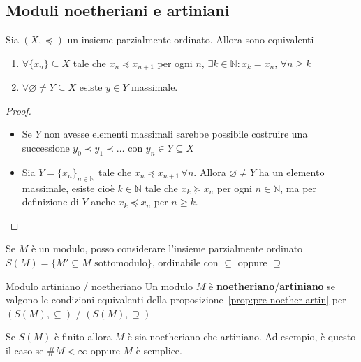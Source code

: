 \subsection{Moduli noetheriani e artiniani}
\begin{proposition}{}\label{prop:pre-noether-artin}
Sia \({(X, \preccurlyeq)}\) un insieme parzialmente ordinato. Allora sono
equivalenti
\begin{enumerate}[label = (\roman*)]
    \item \(\forall \{ x_{n}\} \subseteq X\) tale che \(x_{n} \preccurlyeq
        x_{n+1}\) per ogni \(n\), \(\exists k \in \mathbb{N}: x_k = x_n\),
        \(\forall n \ge k\) 
    \item \(\forall \varnothing \neq Y \subseteq X \) esiste \(y \in Y\)
        massimale.
\end{enumerate}
\end{proposition}
\begin{proof}\( \)
\begin{itemize}
    \item[\((i) \implies (ii)\)] Se \(Y\) non avesse
        elementi massimali sarebbe possibile costruire una successione \(y_{0}
        \prec y_{1} \prec \dots \) con \(y_{n} \in Y \subseteq X \) \item[\((ii)
        \implies  (i)\)] Sia \(Y = \{x_{n}\}_{n \in \mathbb{N}} \) tale che
        \(x_{n} \preccurlyeq x_{n+1} \,\forall n \). Allora \(\varnothing \neq
        Y\) ha un elemento massimale, esiste cioè \(k \in \mathbb{N}\) tale che
        \(x_k \succcurlyeq x_n\) per ogni \(n \in \mathbb{N}\), ma per
        definizione di \(Y\) anche \(x_k \preccurlyeq x_n \) per \(n \ge k\).
\end{itemize}
\end{proof}

Se \(M\) è un modulo, posso considerare l'insieme parzialmente ordinato \(S{(M)}
= \{ M' \subseteq M \text{ sottomodulo}\}\), ordinabile con \(\subseteq  \)
oppure \(\supseteq \) 

\begin{definition}{Modulo artiniano / noetheriano}
    Un modulo \(M\) è \textbf{noetheriano}/\textbf{artiniano} se valgono le
    condizioni equivalenti della proposizione~\ref{prop:pre-noether-artin} per
    \({(S{(M)}, \subseteq )}\) / \({(S{(M)}, \supseteq  )}\) 
\end{definition}
\begin{example}{}
    Se \(S{(M)}\) è finito allora \(M\) è sia noetheriano che artiniano. Ad
    esempio, è questo il caso se \(\#M < \infty\) oppure \(M\) è semplice.
\end{example}

